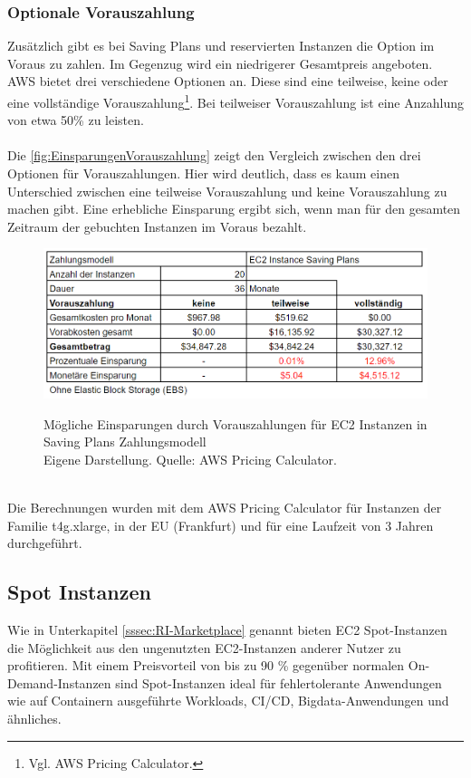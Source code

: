 \subsubsection*{Optionale Vorauszahlung}\label{sssec:Vorauszahlung}
Zusätzlich gibt es bei Saving Plans und reservierten Instanzen die Option im Voraus zu zahlen. Im Gegenzug wird ein niedrigerer Gesamtpreis angeboten. AWS bietet drei verschiedene Optionen an. Diese sind eine teilweise, keine oder eine vollständige Vorauszahlung\footnote{Vgl.  AWS Pricing Calculator\cite{AMZ17}.}. Bei teilweiser Vorauszahlung ist eine Anzahlung von etwa 50\% zu leisten.
\\\\
Die \autoref{fig:EinsparungenVorauszahlung} zeigt den Vergleich zwischen den drei Optionen für Vorauszahlungen. Hier wird deutlich, dass es kaum einen Unterschied zwischen eine teilweise Vorauszahlung und keine Vorauszahlung zu machen gibt. Eine erhebliche Einsparung ergibt sich, wenn man für den gesamten Zeitraum der gebuchten Instanzen im Voraus bezahlt.
\begin{figure}[h!]
    \centering
    \includegraphics[scale=0.6]{sources/EinsparungenVorauszahlung}\label{fig:EinsparungenVorauszahlung}\\
    \caption[Mögliche Einsparungen durch Vorauszahlungen]{}
    \label{fig:EinsparungenVorauszahlung}Mögliche Einsparungen durch Vorauszahlungen für EC2 Instanzen in Saving Plans Zahlungsmodell\\
    Eigene Darstellung. Quelle: {AWS Pricing Calculator\cite{AMZ17}.}
  \end{figure}
  \\
Die Berechnungen wurden mit dem AWS Pricing Calculator {\cite{AMZ17}} für Instanzen der Familie t4g.xlarge, in der EU (Frankfurt) und für eine Laufzeit von 3 Jahren durchgeführt. 
\subsection{Spot Instanzen }\label{ssec:Spot-Instances}
Wie in Unterkapitel \ref{sssec:RI-Marketplace} genannt bieten EC2 Spot-Instanzen die Möglichkeit aus den ungenutzten EC2-Instanzen anderer Nutzer zu profitieren. 
Mit einem Preisvorteil von bis zu 90 \% gegenüber normalen On-Demand-Instanzen sind Spot-Instanzen ideal für fehlertolerante Anwendungen wie auf Containern ausgeführte Workloads, CI/CD, Bigdata-Anwendungen und ähnliches.

